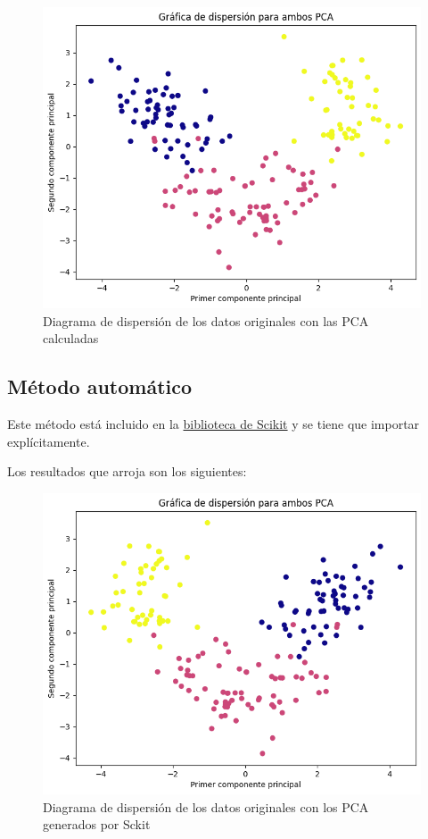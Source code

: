 \begin{center}
    \begin{figure}[!ht]
        \centering
        \includegraphics[scale=0.67]{Manual_PCA_Scatter.png}
        \caption{Diagrama de dispersión de los datos originales con las PCA calculadas}
    \end{figure}
\end{center}
\vskip 10cm

\subsection[Automatico]{Método automático}
Este método está incluido en la \href{https://scikit-learn.org/stable/modules/generated/sklearn.decomposition.PCA.html}{biblioteca de Scikit} y se tiene que importar explícitamente.

Los resultados que arroja son los siguientes:
\begin{center}
    \begin{figure}[!ht]
        \centering
        \includegraphics[scale=0.67]{Auto_PCA_Scatter.png}
        \caption{Diagrama de dispersión de los datos originales con los PCA generados por Sckit}
    \end{figure}
\end{center}
\vskip 10cm
